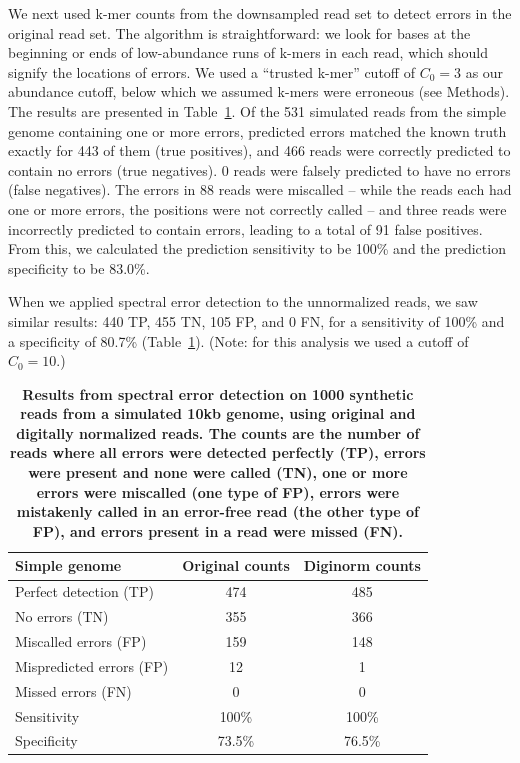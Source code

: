 \documentclass{article}
\begin{document}
We next used k-mer counts from the downsampled read set to detect
errors in the original read set.  The algorithm is straightforward: we
look for bases at the beginning or ends of low-abundance runs of
k-mers in each read, which should signify the locations of errors. We
used a ``trusted k-mer'' cutoff of $C_0 = 3$ as our abundance cutoff,
below which we assumed k-mers were erroneous (see Methods).  The
results are presented in Table~\ref{tab:a}.  Of the 531 simulated
reads from the simple genome containing one or more errors, predicted
errors matched the known truth exactly for 443 of them (true
positives), and 466 reads were correctly predicted to contain no
errors (true negatives). 0 reads were falsely predicted to have no
errors (false negatives). The errors in 88 reads were miscalled --
while the reads each had one or more errors, the positions were not
correctly called -- and three reads were incorrectly predicted to
contain errors, leading to a total of 91 false positives.  From this,
we calculated the prediction sensitivity to be 100\% and the
prediction specificity to be 83.0\%.


When we applied spectral error detection to the unnormalized reads, we
saw similar results: 440 TP, 455 TN, 105 FP, and 0 FN, for a
sensitivity of 100\% and a specificity of 80.7\% (Table~\ref{tab:a}).
(Note: for this analysis we used a cutoff of $C_0=10$.)


\begin{table}
\begin{tabular}{|l|c|c|}
\hline
{\bf Simple genome} & Original counts & Diginorm counts \\
\hline
Perfect detection (TP) & 474 & 485 \\
No errors (TN) & 355 & 366 \\
Miscalled errors (FP) & 159 & 148 \\
Mispredicted errors (FP) & 12 & 1 \\
Missed errors (FN) & 0 & 0 \\
\hline
Sensitivity & 100\% & 100\% \\
Specificity & 73.5\% & 76.5\% \\
\hline
\end{tabular}

\caption{{\bf Results from spectral error detection on 1000 synthetic
    reads from a simulated 10kb genome, using original and digitally
    normalized reads.  The counts are the number of reads where all
    errors were detected perfectly (TP), errors were present and none
    were called (TN), one or more errors were miscalled (one type of
    FP), errors were mistakenly called in an error-free read (the
    other type of FP), and errors present in a read were missed
    (FN).}}
\label{tab:a}
\end{table}
\end{document}
